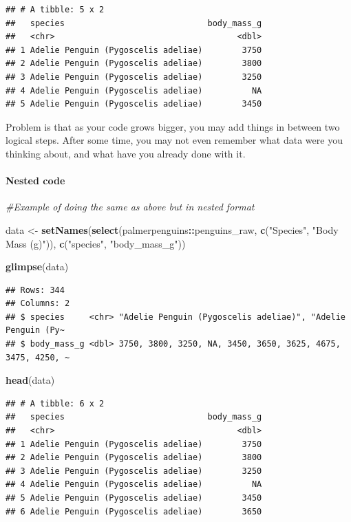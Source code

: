\documentclass[
]{article}
\newenvironment{Shaded}{\begin{snugshade}}{\end{snugshade}}
\newcommand{\CommentTok}[1]{\textcolor[rgb]{0.56,0.35,0.01}{\textit{#1}}}
\newcommand{\FunctionTok}[1]{\textcolor[rgb]{0.13,0.29,0.53}{\textbf{#1}}}
\newcommand{\NormalTok}[1]{#1}
\newcommand{\OtherTok}[1]{\textcolor[rgb]{0.56,0.35,0.01}{#1}}
\newcommand{\SpecialCharTok}[1]{\textcolor[rgb]{0.81,0.36,0.00}{\textbf{#1}}}
\newcommand{\StringTok}[1]{\textcolor[rgb]{0.31,0.60,0.02}{#1}}
\begin{document}
\begin{verbatim}
## # A tibble: 5 x 2
##   species                             body_mass_g
##   <chr>                                     <dbl>
## 1 Adelie Penguin (Pygoscelis adeliae)        3750
## 2 Adelie Penguin (Pygoscelis adeliae)        3800
## 3 Adelie Penguin (Pygoscelis adeliae)        3250
## 4 Adelie Penguin (Pygoscelis adeliae)          NA
## 5 Adelie Penguin (Pygoscelis adeliae)        3450
\end{verbatim}

Problem is that as your code grows bigger, you may add things in between
two logical steps. After some time, you may not even remember what data
were you thinking about, and what have you already done with it.

\hypertarget{nested-code}{%
\paragraph{Nested code}\label{nested-code}}

\begin{Shaded}
\begin{Highlighting}[]
\CommentTok{\#Example of doing the same as above but in nested format}

\NormalTok{data }\OtherTok{\textless{}{-}} \FunctionTok{setNames}\NormalTok{(}\FunctionTok{select}\NormalTok{(palmerpenguins}\SpecialCharTok{::}\NormalTok{penguins\_raw, }\FunctionTok{c}\NormalTok{(}\StringTok{"Species"}\NormalTok{, }\StringTok{"Body Mass (g)"}\NormalTok{)), }\FunctionTok{c}\NormalTok{(}\StringTok{"species"}\NormalTok{, }\StringTok{"body\_mass\_g"}\NormalTok{))}

\FunctionTok{glimpse}\NormalTok{(data)}
\end{Highlighting}
\end{Shaded}

\begin{verbatim}
## Rows: 344
## Columns: 2
## $ species     <chr> "Adelie Penguin (Pygoscelis adeliae)", "Adelie Penguin (Py~
## $ body_mass_g <dbl> 3750, 3800, 3250, NA, 3450, 3650, 3625, 4675, 3475, 4250, ~
\end{verbatim}

\begin{Shaded}
\begin{Highlighting}[]
\FunctionTok{head}\NormalTok{(data)}
\end{Highlighting}
\end{Shaded}

\begin{verbatim}
## # A tibble: 6 x 2
##   species                             body_mass_g
##   <chr>                                     <dbl>
## 1 Adelie Penguin (Pygoscelis adeliae)        3750
## 2 Adelie Penguin (Pygoscelis adeliae)        3800
## 3 Adelie Penguin (Pygoscelis adeliae)        3250
## 4 Adelie Penguin (Pygoscelis adeliae)          NA
## 5 Adelie Penguin (Pygoscelis adeliae)        3450
## 6 Adelie Penguin (Pygoscelis adeliae)        3650
\end{verbatim}
\end{document}
